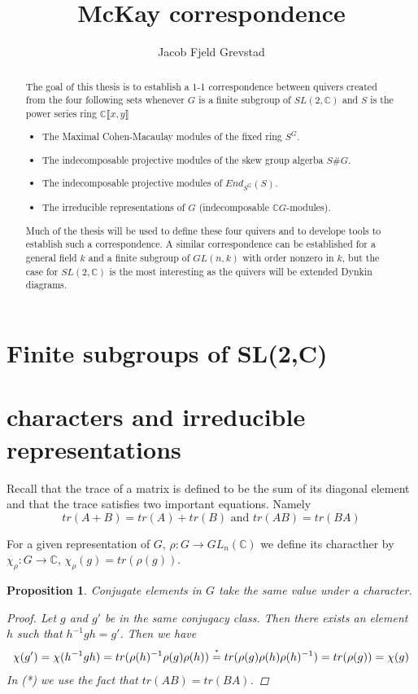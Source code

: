\documentclass[11pt, a4paper, english]{article}
\newtheorem*{prop}{Proposition}
\newcommand{\C}{\mathbb{C}}
\begin{document}
\title{McKay correspondence}
\author{Jacob Fjeld Grevstad}
\maketitle

\begin{abstract}
The goal of this thesis is to establish a 1-1 correspondence between quivers created from the four following sets whenever $G$ is a finite subgroup of $SL(2,\C)$ and $S$ is the power series ring $\C \llbracket x, y \rrbracket$
\begin{itemize}
\item The Maximal Cohen-Macaulay modules of the fixed ring $S^G$.
\item The indecomposable projective modules of the skew group algerba $S\#G$.
\item The indecomposable projective modules of $End_{S^G}(S)$.
\item The irreducible representations of $G$ (indecomposable $\C G$-modules).
\end{itemize}
Much of the thesis will be used to define these four quivers and to develope tools to establish such a correspondence. A similar correspondence can be established for a general field $k$ and a finite subgroup of $GL(n, k)$ with order nonzero in $k$, but the case for $SL(2,\C)$ is the most interesting as the quivers will be extended Dynkin diagrams.
\end{abstract}

\section*{Finite subgroups of SL(2,C)}

\section*{characters and irreducible representations}
Recall that the trace of a matrix is defined to be the sum of its diagonal element and that the trace satisfies two important equations. Namely
$$tr(A+B)=tr(A)+tr(B) \text{  and  } tr(AB)=tr(BA)$$

For a given representation of $G$, $\rho: G \to GL_n(\mathbb{C})$ we define its characther by $\chi_\rho : G \to \mathbb{C}$, $\chi_\rho(g) = tr(\rho(g))$.

\begin{prop}
Conjugate elements in $G$ take the same value under a character.
\begin{proof}
Let $g$ and $g'$ be in the same conjugacy class. Then there exists an element $h$ such that $h^{-1}gh=g'$. Then we have
\begin{equation*}
\begin{split}
\chi(g')=\chi(h^{-1}gh) = tr(\rho(h)^{-1}\rho(g)\rho(h)) \stackrel{\mathclap{\normalfont\mbox{\tiny{*}}}}{=} tr(\rho(g)\rho(h)\rho(h)^{-1}) = tr(\rho(g))=\chi(g)
\end{split}
\end{equation*}
In (*) we use the fact that $tr(AB)=tr(BA)$.
\end{proof}
\end{prop}
\end{document}
